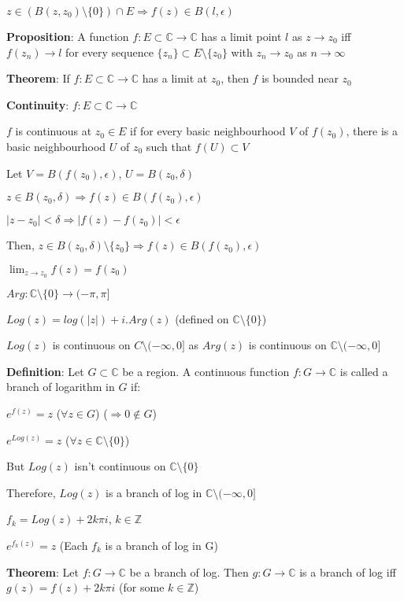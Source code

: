 \documentclass{article}
\begin{document}
\begin{flushleft}
$z \in (B(z,z_0)\setminus\{0\})\cap E \Rightarrow f(z)\in B(l,\epsilon)$ 

\textbf{Proposition}: A function $f:E\subset  \mathds{C}\rightarrow \mathds{C}$ has a limit point $l$ as $z\rightarrow z_0$ iff $f(z_n)\rightarrow l$ for every sequence $\{z_n\}\subset E\setminus \{z_0\}$ with $z_n\rightarrow z_0$ as $n\rightarrow \infty$

\textbf{Theorem}: If $f:E\subset \mathds{C} \rightarrow \mathds{C}$ has a limit at $z_0$, then $f$ is bounded near $z_0$

\textbf{Continuity}: $f:E\subset \mathds{C}\rightarrow \mathds{C}$

$f$ is continuous at $z_0\in E$ if for every basic neighbourhood $V$ of $f(z_0)$, there is a basic neighbourhood $U$ of $z_0$ such that $f(U)\subset V$

Let $V=B(f(z_0),\epsilon)$, $U=B(z_0,\delta)$

$z\in B(z_0,\delta)\Rightarrow f(z)\in B(f(z_0),\epsilon)$

$|z-z_0|<\delta \Rightarrow |f(z)-f(z_0)|<\epsilon$

Then, $z\in B(z_0,\delta)\setminus \{z_0\} \Rightarrow f(z)\in B(f(z_0),\epsilon)$

$\lim_{z \to z_0} f(z)=f(z_0)$

$Arg: \mathds{C}\setminus \{0\} \rightarrow (-\pi,\pi]$

$Log(z)=log(|z|)+i.Arg(z)$ (defined on $\mathds{C}\setminus \{0\}$)

$Log(z)$ is continuous on $C\setminus (-\infty,0]$ as $Arg(z)$ is continuous on $\mathds{C}\setminus (-\infty,0]$

\textbf{Definition}: Let $G\subset \mathds{C}$ be a region. A continuous function $f:G\rightarrow \mathds{C}$ is called a branch of logarithm in $G$ if:

$e^{f(z)}=z$ ($\forall z\in G$) ($\Rightarrow 0\notin G$)

$e^{Log(z)}=z$ ($\forall z\in \mathds{C}\setminus \{0\}$)

But $Log(z)$ isn't continuous on $\mathds{C}\setminus\{0\}$

Therefore, $Log(z)$ is a branch of log in $\mathds{C}\setminus (-\infty,0]$ 

$f_k=Log(z)+2k\pi i$, $k\in \mathds{Z}$

$e^{f_k(z)}=z$ (Each $f_k$ is a branch of log in G)

\textbf{Theorem}: Let $f:G\rightarrow \mathds{C}$ be a branch of log. Then $g:G\rightarrow \mathds{C}$ is a branch of log iff $g(z)=f(z)+2k\pi i$ (for some $k\in \mathds{Z}$)


\end{flushleft}
\end{document}
